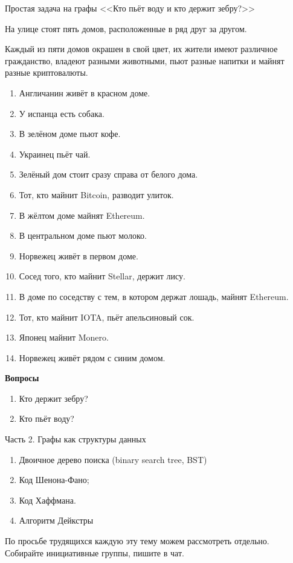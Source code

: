 \begin{frame}{Простая задача на графы <<Кто пьёт воду и кто держит зебру?>>}

\tiny
На улице стоят пять домов, расположенные в ряд друг за другом. 

Каждый из пяти домов окрашен в свой цвет, их жители имеют различное гражданство, владеют разными животными, пьют разные напитки и майнят разные криптовалюты.

\begin{enumerate}
	\item Англичанин живёт в красном доме.
	\item У испанца есть собака.
	\item В зелёном доме пьют кофе.
	\item Украинец пьёт чай.
	\item Зелёный дом стоит сразу справа от белого дома.
	\item Тот, кто майнит Bitcoin, разводит улиток.
	\item В жёлтом доме майнят Ethereum.
	\item В центральном доме пьют молоко.
	\item Норвежец живёт в первом доме.
	\item Сосед того, кто майнит Stellar, держит лису.
	\item В доме по соседству с тем, в котором держат лошадь, майнят Ethereum.
	\item Тот, кто майнит IOTA, пьёт апельсиновый сок.
	\item Японец майнит Monero.
	\item Норвежец живёт рядом с синим домом.
\end{enumerate}

\textbf{Вопросы}
\begin{enumerate}
	\item Кто держит зебру?
	\item Кто пьёт воду?
\end{enumerate} 


\end{frame}


\begin{frame}{Часть 2. Графы как структуры данных}
	
\begin{enumerate}
  \item Двоичное дерево поиска (binary search tree, BST)
  \item Код Шенона-Фано; 
  \item Код Хаффмана.
  \item Алгоритм Дейкстры
\end{enumerate}



По просьбе трудящихся каждую эту тему можем рассмотреть отдельно. 
Собирайте инициативные группы, пишите в чат.


\end{frame}

